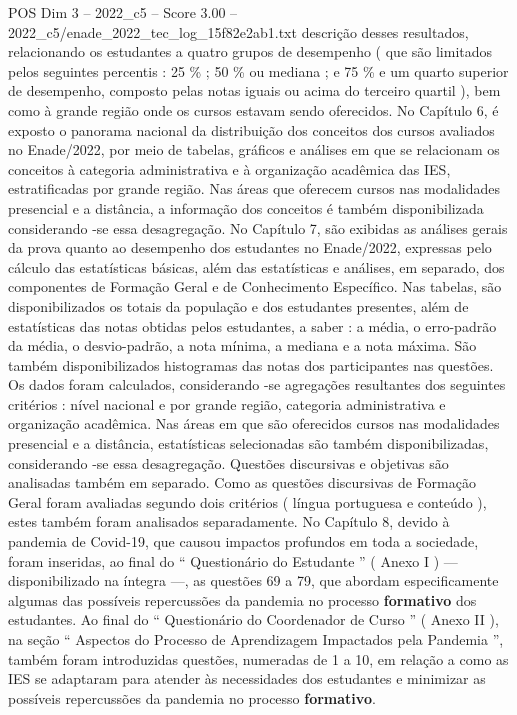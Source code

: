 \begin{textsample}{POS Dim 3 – 2022\_c5 – Score 3.00 – 2022\_c5/enade\_2022\_tec\_log\_15f82e2ab1.txt}  \label{ex:f3_pos_062}
descrição desses resultados, relacionando os estudantes a quatro grupos de desempenho ( que são limitados pelos seguintes percentis : 25 \% ; 50 \% ou mediana ; e 75 \% e um quarto superior de desempenho, composto pelas notas iguais ou acima do terceiro quartil ), bem como à grande região onde os cursos estavam sendo oferecidos.
No Capítulo 6, é exposto o panorama nacional da distribuição dos conceitos dos cursos avaliados no Enade/2022, por meio de tabelas, gráficos e análises em que se relacionam os conceitos à categoria administrativa e à organização acadêmica das IES, estratificadas por grande região.
Nas áreas que oferecem cursos nas modalidades presencial e a distância, a informação dos conceitos é também disponibilizada considerando -se essa desagregação.
No Capítulo 7, são exibidas as análises gerais da prova quanto ao desempenho dos estudantes no Enade/2022, expressas pelo cálculo das estatísticas básicas, além das estatísticas e análises, em separado, dos componentes de Formação Geral e de Conhecimento Específico.
Nas tabelas, são disponibilizados os totais da população e dos estudantes presentes, além de estatísticas das notas obtidas pelos estudantes, a saber : a média, o erro-padrão da média, o desvio-padrão, a nota mínima, a mediana e a nota máxima.
São também disponibilizados histogramas das notas dos participantes nas questões.
Os dados foram calculados, considerando -se agregações resultantes dos seguintes critérios : nível nacional e por grande região, categoria administrativa e organização acadêmica.
Nas áreas em que são oferecidos cursos nas modalidades presencial e a distância, estatísticas selecionadas são também disponibilizadas, considerando -se essa desagregação.
Questões discursivas e objetivas são analisadas também em separado.
Como as questões discursivas de Formação Geral foram avaliadas segundo dois critérios ( língua portuguesa e conteúdo ), estes também foram analisados separadamente.
No Capítulo 8, devido à pandemia de Covid-19, que causou impactos profundos em toda a sociedade, foram inseridas, ao final do “ Questionário do Estudante ” ( Anexo I ) — disponibilizado na íntegra —, as questões 69 a 79, que abordam especificamente algumas das possíveis repercussões da pandemia no processo \textbf{formativo} dos estudantes.
Ao final do “ Questionário do Coordenador de Curso ” ( Anexo II ), na seção “ Aspectos do Processo de Aprendizagem Impactados pela Pandemia ”, também foram introduzidas questões, numeradas de 1 a 10, em relação a como as IES se adaptaram para atender às necessidades dos estudantes e minimizar as possíveis repercussões da pandemia no processo \textbf{formativo}.

\end{textsample}

